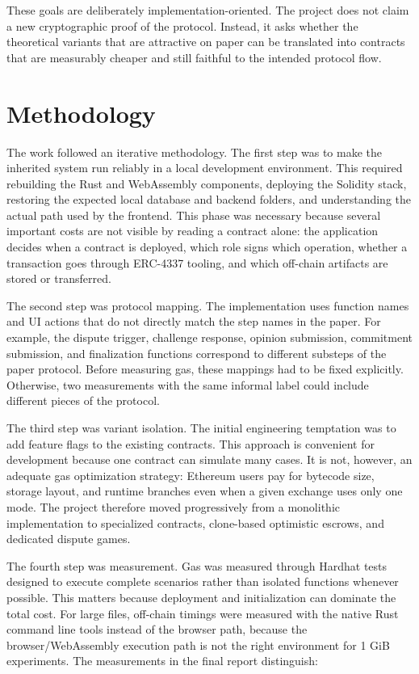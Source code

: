 These goals are deliberately implementation-oriented. The project does not claim a new
cryptographic proof of the \sox{} protocol. Instead, it asks whether the theoretical variants
that are attractive on paper can be translated into contracts that are measurably cheaper and
still faithful to the intended protocol flow.

\section{Methodology}

The work followed an iterative methodology. The first step was to make the inherited system
run reliably in a local development environment. This required rebuilding the Rust and
WebAssembly components, deploying the Solidity stack, restoring the expected local database
and backend folders, and understanding the actual path used by the frontend. This phase was
necessary because several important costs are not visible by reading a contract alone: the
application decides when a contract is deployed, which role signs which operation, whether a
transaction goes through ERC-4337 tooling, and which off-chain artifacts are stored or
transferred.

The second step was protocol mapping. The implementation uses function names and UI actions
that do not directly match the step names in the paper. For example, the dispute trigger,
challenge response, opinion submission, commitment submission, and finalization functions
correspond to different substeps of the paper protocol. Before measuring gas, these mappings
had to be fixed explicitly. Otherwise, two measurements with the same informal label could
include different pieces of the protocol.

The third step was variant isolation. The initial engineering temptation was to add feature
flags to the existing contracts. This approach is convenient for development because one
contract can simulate many cases. It is not, however, an adequate gas optimization strategy:
Ethereum users pay for bytecode size, storage layout, and runtime branches even when a given
exchange uses only one mode. The project therefore moved progressively from a monolithic
implementation to specialized contracts, clone-based optimistic escrows, and dedicated
dispute games.

The fourth step was measurement. Gas was measured through Hardhat tests designed to execute
complete scenarios rather than isolated functions whenever possible. This matters because
deployment and initialization can dominate the total cost. For large files, off-chain timings
were measured with the native Rust command line tools instead of the browser path, because
the browser/WebAssembly execution path is not the right environment for 1 GiB experiments.
The measurements in the final report distinguish:

